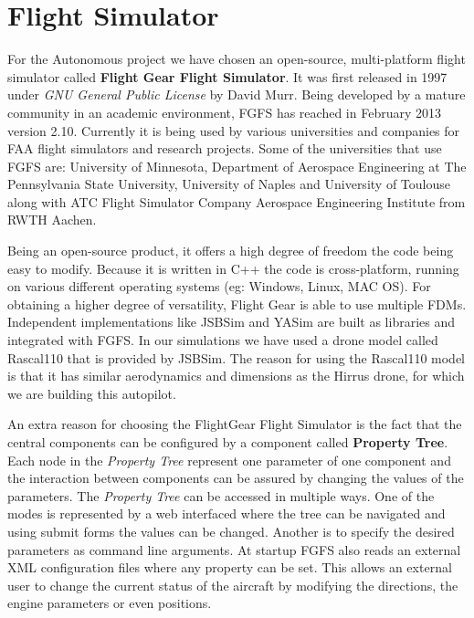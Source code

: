 
\chapter{Flight Simulator}
\label{sec:fgfs}
For the Autonomous project we have chosen an open-source, multi-platform
flight simulator called \textbf{Flight Gear Flight Simulator}. It was first
released in 1997 under \textit{GNU General Public License} by David Murr. Being
developed by a mature community in an academic environment,  FGFS has reached in February 2013 version 2.10. Currently
it is being used by various universities and companies for FAA flight simulators
and research projects. Some of the universities that use FGFS are: University of
Minnesota, Department of Aerospace Engineering at The Pennsylvania State University,
University of Naples and University of Toulouse along with ATC Flight Simulator
Company Aerospace Engineering Institute from RWTH Aachen.

Being an open-source product, it offers a high degree of freedom the code being
easy to modify. Because it is written in C++ the code is cross-platform, running
on various different operating systems (eg: Windows, Linux, MAC OS). For
obtaining a higher degree of versatility, Flight Gear is able to use multiple
FDMs. Independent implementations like
JSBSim and YASim are built as libraries and integrated with FGFS. In our simulations
we have used a drone model called Rascal110 that is provided by JSBSim. The
reason for using the Rascal110 model is that it has similar aerodynamics and
dimensions as the Hirrus drone, for which we are building this autopilot.

An extra reason for choosing the FlightGear Flight Simulator is the fact that the 
central components can be configured by a component called \textbf{Property Tree}.
Each node in the \textit{Property Tree} represent one parameter of one component
and the interaction between components can be assured by changing the values of
the parameters. The \textit{Property Tree} can be accessed in multiple ways.
One of the modes is represented by a web interfaced where the tree can be navigated
and using submit forms the values can be changed. Another is to specify the
desired parameters as command line arguments. At startup FGFS also reads an
external XML configuration files where
any property can be set. This allows an external user to change the current
status of the aircraft by modifying the directions, the engine parameters or even positions.

